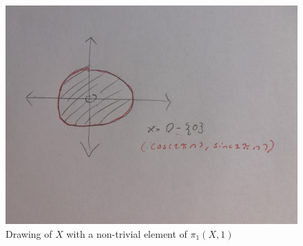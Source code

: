 \documentclass[11pt, letter]{amsart}
\theoremstyle{definition}
\begin{document}
\begin{center}
\begin{figure}
    \centering
    \includegraphics[scale=0.1]{Drawing of X.jpg}
    \caption{Drawing of $X$ with a non-trivial element of $\pi_1(X, 1)$}
    \label{fig:X}
\end{figure}
\end{center}
\end{document}
